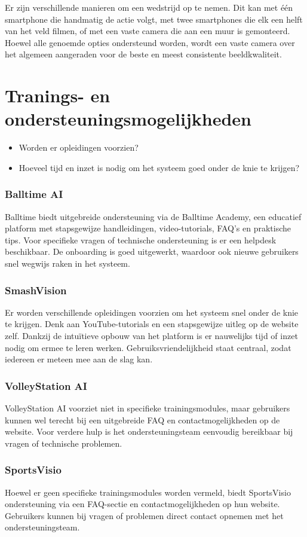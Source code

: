 Er zijn verschillende manieren om een wedstrijd op te nemen. Dit kan met één smartphone die handmatig de actie volgt, met twee smartphones die elk een helft van het veld filmen, of met een vaste camera die aan een muur is gemonteerd. Hoewel alle genoemde opties ondersteund worden, wordt een vaste camera over het algemeen aangeraden voor de beste en meest consistente beeldkwaliteit.

\section{Tranings- en ondersteuningsmogelijkheden}
\begin{itemize}
  \item Worden er opleidingen voorzien?
  \item Hoeveel tijd en inzet is nodig om het systeem goed onder de knie te krijgen?
\end{itemize}
\subsubsection{Balltime AI}
Balltime biedt uitgebreide ondersteuning via de Balltime Academy, een educatief platform met stapsgewijze handleidingen, video-tutorials, FAQ’s en praktische tips. Voor specifieke vragen of technische ondersteuning is er een helpdesk beschikbaar. De onboarding is goed uitgewerkt, waardoor ook nieuwe gebruikers snel wegwijs raken in het systeem.
\subsubsection{SmashVision}
Er worden verschillende opleidingen voorzien om het systeem snel onder de knie te krijgen. Denk aan YouTube-tutorials en een stapsgewijze uitleg op de website zelf. Dankzij de intuïtieve opbouw van het platform is er nauwelijks tijd of inzet nodig om ermee te leren werken. Gebruiksvriendelijkheid staat centraal, zodat iedereen er meteen mee aan de slag kan.
\subsubsection{VolleyStation AI}
VolleyStation AI voorziet niet in specifieke trainingsmodules, maar gebruikers kunnen wel terecht bij een uitgebreide FAQ en contactmogelijkheden op de website. Voor verdere hulp is het ondersteuningsteam eenvoudig bereikbaar bij vragen of technische problemen.
\subsubsection{SportsVisio}
Hoewel er geen specifieke trainingsmodules worden vermeld, biedt SportsVisio ondersteuning via een FAQ-sectie en contactmogelijkheden op hun website. Gebruikers kunnen bij vragen of problemen direct contact opnemen met het ondersteuningsteam.

